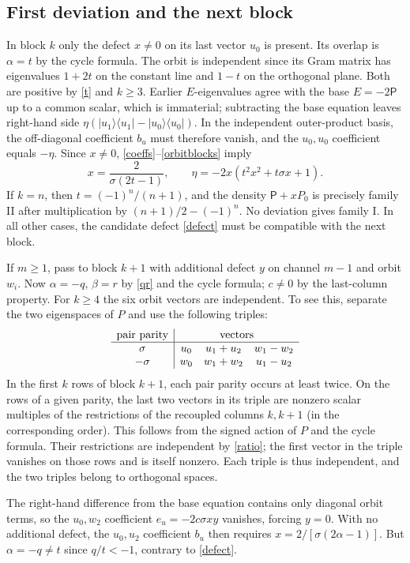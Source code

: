 \documentclass[11pt]{article}
\newcommand{\PP}{\mathsf P}
\newcommand{\pr}[1]{|#1\rangle\langle#1|}
\begin{document}
\subsection{First deviation and the next block}
In block $k$ only the defect $x\ne0$ on its last vector $u_0$ is present. Its overlap is $\alpha=t$ by the cycle formula. The orbit is independent since its Gram matrix has eigenvalues $1+2t$ on the constant line and $1-t$ on the orthogonal plane. Both are positive by \eqref{t} and $k\ge3$. Earlier $E$-eigenvalues agree with the base $E=-2\PP$ up to a common scalar, which is immaterial; subtracting the base equation leaves right-hand side $\eta(\pr{u_1}-\pr{u_0})$. In the independent outer-product basis, the off-diagonal coefficient $b_u$ must therefore vanish, and the $u_0,u_0$ coefficient equals $-\eta$. Since $x\ne0$, \eqref{coeffs}--\eqref{orbitblocks} imply
\begin{equation}\label{defect}
 x=\frac{2}{\sigma(2t-1)},\qquad
 \eta=-2x(t^2x^2+t\sigma x+1).
\end{equation}
If $k=n$, then $t=(-1)^n/(n+1)$, and the density $\PP+xP_0$ is precisely family II after multiplication by $(n+1)/2-(-1)^n$. No deviation gives family I. In all other cases, the candidate defect \eqref{defect} must be compatible with the next block.

If $m\ge1$, pass to block $k+1$ with additional defect $y$ on channel $m-1$ and orbit $w_i$. Now $\alpha=-q$, $\beta=r$ by \eqref{qr} and the cycle formula; $c\ne0$ by the last-column property. For $k\ge4$ the six orbit vectors are independent. To see this, separate the two eigenspaces of $P$ and use the following triples:
\[
 \begin{array}{c|ccc}
 \text{pair parity}&\multicolumn{3}{c}{\text{vectors}}\\ \hline
 \sigma &u_0&u_1+u_2&w_1-w_2\\
 -\sigma&w_0&w_1+w_2&u_1-u_2
 \end{array}
\]
In the first $k$ rows of block $k+1$, each pair parity occurs at least twice. On the rows of a given parity, the last two vectors in its triple are nonzero scalar multiples of the restrictions of the recoupled columns $k,k+1$ (in the corresponding order). This follows from the signed action of $P$ and the cycle formula. Their restrictions are independent by \eqref{ratio}; the first vector in the triple vanishes on those rows and is itself nonzero. Each triple is thus independent, and the two triples belong to orthogonal spaces.

The right-hand difference from the base equation contains only diagonal orbit terms, so the $u_0,w_2$ coefficient $e_u=-2c\sigma xy$ vanishes, forcing $y=0$. With no additional defect, the $u_0,u_2$ coefficient $b_u$ then requires $x=2/[\sigma(2\alpha-1)]$. But $\alpha=-q\ne t$ since $q/t<-1$, contrary to \eqref{defect}. 
\end{document}
